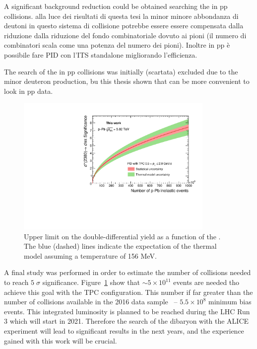 A significant background reduction could be obtained searching the \ds in pp collisions.
alla luce dei risultati di questa tesi la minor
minore abbondanza di deutoni in questo sistema di collisione potrebbe essere 
essere compensata dalla riduzione dalla riduzione del fondo combinatoriale dovuto ai pioni 
(il numero di combinatori scala come una potenza del numero dei pioni).
Inoltre in pp è possibile fare PID con l'ITS standalone migliorando l'efficienza.

The search of the \ds in pp collisions was initially (scartata) excluded due to the minor deuteron 
production, bu this thesis shown that can be more convenient to look in pp data. 

\begin{figure} [htb]
    \centering
    \includegraphics[width=0.85\textwidth]{gfx/sig_TPC}
    \caption{Upper limit on the double-differential \ds yield as a function of the \pt. The blue (dashed) lines indicate the expectation of the thermal model assuming a temperature of 156 MeV.}
	\label{fig:proj1}
\end{figure}

A final study was performed in order to estimate the number of \pPb collisions needed to reach 
$5\;\sigma$ significance.
Figure~\ref{fig:proj1} show that $\sim 5\times10^{11}$ events are needed tho achieve this goal with the
TPC configuration.
This number if far greater than the number of \pPb collisions available in the 2016 data sample
\ -- $5.5\times10^{8}$ minimum bias events.
This integrated luminosity is planned to be reached during the LHC Run 3 which will start in 2021.
Therefore the search of the \ds dibaryon with the ALICE experiment will lead to significant results
in the next years, and the experience gained with this work will be crucial.






